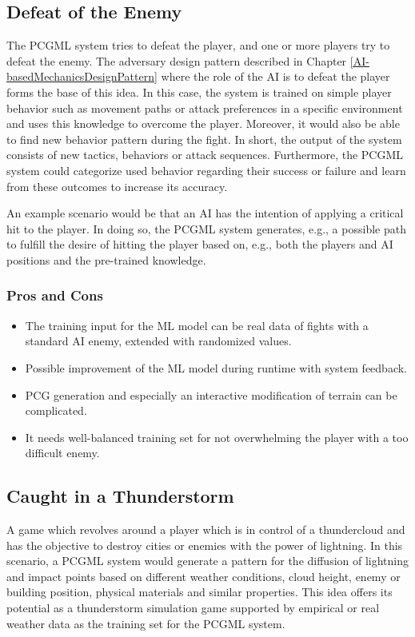 \documentclass[MGS,Master,english]{twbook}%
\begin{document}
\subsection{Defeat of the Enemy} \label{idea::defeatTheEnemy}
The PCGML system tries to defeat the player, and one or more players try to defeat the enemy. The adversary design pattern described in Chapter \ref{AI-basedMechanicsDesignPattern} where the role of the AI is to defeat the player forms the base of this idea. In this case, the system is trained on simple player behavior such as movement paths or attack preferences in a specific environment and uses this knowledge to overcome the player. Moreover, it would also be able to find new behavior pattern during the fight. In short, the output of the system consists of new tactics, behaviors or attack sequences. Furthermore, the PCGML system could categorize used behavior regarding their success or failure and learn from these outcomes to increase its accuracy. 

An example scenario would be that an AI has the intention of applying a critical hit to the player. In doing so, the PCGML system generates, e.g., a possible path to fulfill the desire of hitting the player based on, e.g., both the players and AI positions and the pre-trained knowledge.

\subsubsection{Pros and Cons}
\begin{itemize}
	\item The training input for the ML model can be real data of fights with a standard AI enemy, extended with randomized values.
	\item Possible improvement of the ML model during runtime with system feedback.
	\item PCG generation and especially an interactive modification of terrain can be complicated.
	\item It needs well-balanced training set for not overwhelming the player with a too difficult enemy.
\end{itemize}


\subsection{Caught in a Thunderstorm} \label{idea::caughtInAThunderstorm}
A game which revolves around a player which is in control of a thundercloud and has the objective to destroy cities or enemies with the power of lightning. In this scenario, a PCGML system would generate a pattern for the diffusion of lightning and impact points based on different weather conditions, cloud height, enemy or building position, physical materials and similar properties. This idea offers its potential as a thunderstorm simulation game supported by empirical or real weather data as the training set for the PCGML system.
\end{document}
